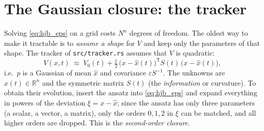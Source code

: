 \documentclass[11pt,a4paper]{article}
\newcommand{\R}{\mathbb{R}}
\newcommand{\T}{^{\mathsf T}}
\newcommand{\xh}{\hat{x}}
\newcommand{\eps}{\varepsilon}
\theoremstyle{plain}
\theoremstyle{definition}
\theoremstyle{remark}
\begin{document}
\section{The Gaussian closure: the tracker}
\label{sec:tracker}

Solving \eqref{eq:hjb_eps} on a grid costs $N^n$ degrees of freedom. The oldest way to make it tractable is to \emph{assume a shape} for $V$ and keep only the parameters of that shape. The tracker of \texttt{src/tracker.rs} assumes that $V$ is quadratic:
\begin{equation}
  V(x,t) \;\approx\; V_0(t) + \tfrac12\,\big(x-\xh(t)\big)\T S(t)\,\big(x-\xh(t)\big),
  \label{eq:ansatz_tracker}
\end{equation}
i.e.\ $p$ is a Gaussian of mean $\xh$ and covariance $\eps S^{-1}$. The unknowns are $\xh(t)\in\R^n$ and the symmetric matrix $S(t)$ (the \emph{information} or curvature). To obtain their evolution, insert the ansatz into \eqref{eq:hjb_eps} and expand everything in powers of the deviation $\xi = x-\xh$; since the ansatz has only three parameters (a scalar, a vector, a matrix), only the orders $0,1,2$ in $\xi$ can be matched, and all higher orders are dropped. This is the \emph{second-order closure}.
\end{document}
